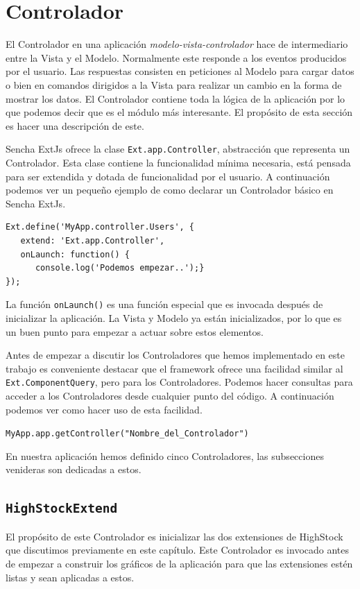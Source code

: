\section{Controlador}
	El Controlador en una aplicación \emph{modelo-vista-controlador}\cite{MVCWiki} hace de intermediario entre la Vista y el Modelo. Normalmente
	este responde a los eventos producidos por el usuario. Las respuestas consisten en peticiones al Modelo para cargar datos o bien en comandos
	dirigidos a la Vista para realizar un cambio en la forma de mostrar los datos. El Controlador contiene toda la lógica de la aplicación por lo
	que podemos decir que es el módulo más interesante. El propósito de esta sección es hacer una descripción de este.
	\par
	Sencha ExtJs ofrece la clase \texttt{Ext.app.Controller}, abstracción que representa un Controlador. Esta clase contiene la funcionalidad
	mínima necesaria, está pensada para ser extendida y dotada de funcionalidad por el usuario. A continuación podemos ver un pequeño ejemplo de
	como declarar un Controlador básico en Sencha ExtJs.
	\begin{lstlisting}[style=myJs]
Ext.define('MyApp.controller.Users', {
   extend: 'Ext.app.Controller',
   onLaunch: function() {
      console.log('Podemos empezar..');}
});
	\end{lstlisting}
	\par
	La función \texttt{onLaunch()} es una función especial que es invocada después de inicializar la aplicación. La Vista y Modelo ya están
	inicializados, por lo que es un buen punto para empezar a actuar sobre estos elementos.
	\par
	Antes de empezar a discutir los Controladores que hemos implementado en este trabajo es conveniente destacar que el framework ofrece una
	facilidad similar al \texttt{Ext.ComponentQuery}, pero para los Controladores. Podemos hacer consultas para acceder a los Controladores desde
	cualquier punto del código. A continuación podemos ver como hacer uso de esta facilidad.
    		\begin{center} \texttt{MyApp.app.getController("Nombre\_del\_Controlador")}  \end{center}
	\par
	En nuestra aplicación hemos definido cinco Controladores, las subsecciones venideras son dedicadas a estos.
	\subsection{\texttt{HighStockExtend}}
		El propósito de este Controlador es inicializar las dos extensiones de HighStock que discutimos previamente en este capítulo. Este
		Controlador es invocado antes de empezar a construir los gráficos de la aplicación para que las extensiones estén listas y sean
		aplicadas a estos.
